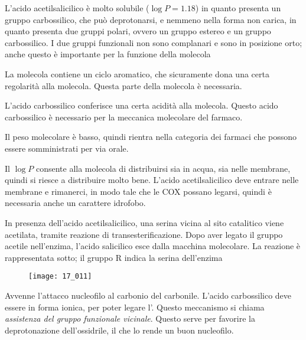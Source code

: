 
L'acido acetilsalicilico è molto solubile (\(\log P = 1.18\)) in quanto
presenta un gruppo carbossilico, che può deprotonarsi, e nemmeno nella
forma non carica, in quanto presenta due gruppi polari, ovvero un gruppo
estereo e un gruppo carbossilico. I due gruppi funzionali non sono
complanari e sono in posizione orto; anche questo è importante per la
funzione della molecola


La molecola contiene un ciclo aromatico, che sicuramente dona una certa
regolarità alla molecola. Questa parte della molecola è necessaria.

L'acido carbossilico conferisce una certa acidità alla molecola. Questo
acido carbossilico è necessario per la meccanica molecolare del farmaco.

Il peso molecolare è basso, quindi rientra nella categoria dei farmaci
che possono essere somministrati per via orale.

Il \(\log P\) consente alla molecola di distribuirsi sia in acqua, sia
nelle membrane, quindi si riesce a distribuire molto bene. L'acido
acetilsalicilico deve entrare nelle membrane e rimanerci, in modo tale
che le COX possano legarsi, quindi è necessaria anche un carattere
idrofobo.


In presenza dell'acido acetilsalicilico, una serina vicina al sito
catalitico viene acetilata, tramite reazione di transesterificazione.
Dopo aver legato il gruppo acetile nell'enzima, l'acido salicilico esce
dalla macchina molecolare. La reazione è rappresentata sotto; il gruppo
R indica la serina dell'enzima

\begin{figure}[H]
    \centering
\texttt{[image: 17\_011]}
\end{figure}

Avvenne l'attacco nucleofilo al carbonio del carbonile. L'acido
carbossilico deve essere in forma ionica, per poter legare l'.
Questo meccanismo si chiama \emph{assistenza del gruppo funzionale
vicinale}. Questo serve per favorire la deprotonazione dell'ossidrile,
il che lo rende un buon nucleofilo.

